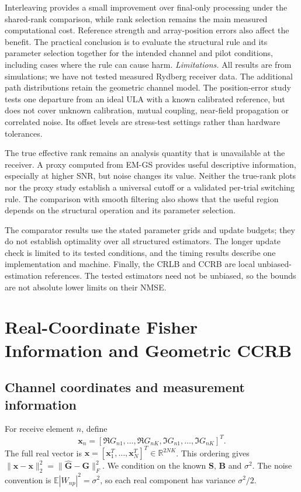 \documentclass[journal]{IEEEtran}
\begin{document}
Interleaving provides a small improvement over final-only processing under
the shared-rank comparison, while rank selection remains the main measured
computational cost. Reference strength and array-position errors also affect
the benefit. The practical conclusion is to evaluate the structural rule
and its parameter selection together for the intended channel and pilot
conditions, including cases where the rule can cause harm.
\textit{Limitations.} All results are from simulations; we have not tested
measured Rydberg receiver data. The additional path distributions retain
the geometric channel model. The position-error study tests one departure
from an ideal ULA with a known calibrated reference, but does not cover
unknown calibration, mutual coupling, near-field propagation or correlated
noise. Its offset levels are stress-test settings rather than hardware
tolerances.

The true effective rank remains an analysis quantity that is unavailable
at the receiver. A proxy computed from EM-GS provides useful descriptive
information, especially at higher SNR, but noise changes its value.
Neither the true-rank plots nor the proxy study establish a universal
cutoff or a validated per-trial switching rule. The comparison with smooth
filtering also shows that the useful region depends on the structural
operation and its parameter selection.

The comparator results use the stated parameter grids and update budgets;
they do not establish optimality over all structured estimators. The longer
update check is limited to its tested conditions, and the timing results
describe one implementation and machine. Finally, the CRLB and CCRB are
local unbiased-estimation references. The tested estimators need not be
unbiased, so the bounds are not absolute lower limits on their NMSE.

\appendices
\section{Real-Coordinate Fisher Information and Geometric CCRB}
\label{app:revision-ccrb}

\subsection{Channel coordinates and measurement information}

For receive element $n$, define
\begin{equation}
\mathbf x_n=
 [\Re G_{n1},\ldots,\Re G_{nK},
  \Im G_{n1},\ldots,\Im G_{nK}]^T.
\end{equation}
The full real vector is
$\mathbf x=[\mathbf x_1^T,\ldots,\mathbf x_N^T]^T\in\mathbb R^{2NK}$.
This ordering gives
$\|\widehat{\mathbf x}-\mathbf x\|_2^2
=\|\widehat{\mathbf G}-\mathbf G\|_F^2$.
We condition on the known $\mathbf S$, $\mathbf B$ and $\sigma^2$.
The noise convention is $\mathbb E|W_{np}|^2=\sigma^2$, so each real
component has variance $\sigma^2/2$.
\end{document}
